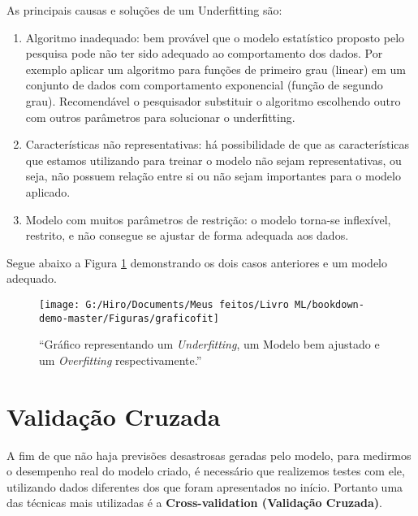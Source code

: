 \documentclass[
]{book}
\begin{document}
As principais causas e soluções de um Underfitting são:

\begin{enumerate}
\def\labelenumi{\arabic{enumi}.}
\item
  Algoritmo inadequado: bem provável que o modelo estatístico proposto pelo pesquisa pode não ter sido adequado ao comportamento dos dados. Por exemplo aplicar um algoritmo para funções de primeiro grau (linear) em um conjunto de dados com comportamento exponencial (função de segundo grau). Recomendável o pesquisador substituir o algoritmo escolhendo outro com outros parâmetros para solucionar o underfitting.
\item
  Características não representativas: há possibilidade de que as características que estamos utilizando para treinar o modelo não sejam representativas, ou seja, não possuem relação entre si ou não sejam importantes para o modelo aplicado.
\item
  Modelo com muitos parâmetros de restrição: o modelo torna-se inflexível, restrito, e não consegue se ajustar de forma adequada aos dados.
\end{enumerate}

Segue abaixo a Figura \ref{fig:graficofit} demonstrando os dois casos anteriores e um modelo adequado.

\begin{figure}

{\centering \texttt{[image: G:/Hiro/Documents/Meus feitos/Livro ML/bookdown-demo-master/Figuras/graficofit]} 

}

\caption{``Gráfico representando um \emph{Underfitting}, um Modelo bem ajustado e um \emph{Overfitting} respectivamente.''}\label{fig:graficofit}
\end{figure}



\hypertarget{validauxe7uxe3o-cruzada}{%
\section{Validação Cruzada}\label{validauxe7uxe3o-cruzada}}

A fim de que não haja previsões desastrosas geradas pelo modelo, para medirmos o desempenho real do modelo criado, é necessário que realizemos testes com ele, utilizando dados diferentes dos que foram apresentados no início. Portanto uma das técnicas mais utilizadas é a \textbf{Cross-validation (Validação Cruzada)}.
\end{document}
